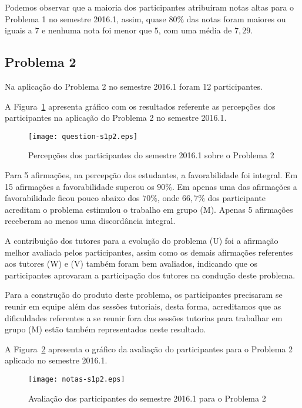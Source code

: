 Podemos observar que a maioria dos participantes atribuíram
notas altas para o Problema 1 no semestre 2016.1, assim, quase $80\%$ das notas
foram maiores ou iguais a $7$ e nenhuma nota foi menor que $5$, com uma média
de $7,29$.
  
\subsection{Problema 2}
Na aplicação do Problema 2 no semestre 2016.1 foram 12 participantes.

A Figura~\ref{percep-s1p2} apresenta gráfico com os resultados referente
as percepções dos participantes na aplicação do
Problema 2 no semestre 2016.1.

\begin{figure}[!htb]
\centering
\texttt{[image: question-s1p2.eps]}
\caption{Percepções dos participantes do semestre 2016.1 sobre o Problema 2}
\label{percep-s1p2}
\end{figure}

Para 5 afirmações, na percepção dos estudantes, a favorabilidade foi integral.
Em 15 afirmações a favorabilidade superou os $90\%$.
Em apenas uma das afirmações a favorabilidade ficou pouco abaixo dos $70\%$, onde
$66,7\%$ dos participante acreditam o problema estimulou
o trabalho em grupo (M).
Apenas 5 afirmações receberam ao menos uma discordância integral.

A contribuição dos tutores para a evolução do problema (U) foi a
afirmação melhor avaliada pelos participantes, assim como os demais
afirmações referentes aos tutores (W) e (V) também foram bem avaliados,
indicando que os participantes aprovaram a participação
dos tutores na condução deste problema.

Para a construção do produto deste problema, os participantes
precisaram se reunir em equipe além das sessões tutoriais, desta forma,
acreditamos que as dificuldades referentes a se reunir fora das sessões tutorias
para trabalhar em grupo (M) estão também representados neste resultado.

A Figura~\ref{aval-s1p2} apresenta o gráfico da
avaliação do participantes para o Problema 2 aplicado no semestre 2016.1.

\begin{figure}[!htb]
\centering
\texttt{[image: notas-s1p2.eps]}
\caption{Avaliação dos participantes do semestre 2016.1 para o Problema 2}
\label{aval-s1p2}
\end{figure}

